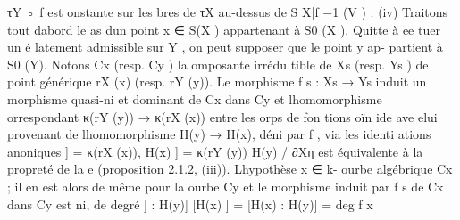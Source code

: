 \documentclass[
  10pt,
]{article}
\newenvironment{Shaded}{}{}
\newcommand{\NormalTok}[1]{#1}
\begin{document}
\begin{Shaded}
\begin{Highlighting}[]
\NormalTok{       τY ◦ f est onstante sur les bres de τX au{-}dessus de S X|f −1 (V ) .}
\NormalTok{(iv) Traitons tout d\textquotesingle{}abord le as d\textquotesingle{}un point x ∈ S(X ) appartenant à S0 (X ).}
\NormalTok{   Quitte à ee tuer un é latement admissible sur Y , on peut supposer que le point y ap{-}}
\NormalTok{partient à S0 (Y). Notons Cx (resp. Cy ) la omposante irrédu tible de Xs (resp. Ys ) de point}
\NormalTok{générique rX (x) (resp. rY (y)).}
\NormalTok{   Le morphisme f s : Xs → Ys induit un morphisme quasi{-}ni et dominant de Cx dans Cy et}
\NormalTok{l\textquotesingle{}homomorphisme orrespondant κ(rY (y)) → κ(rX (x)) entre les orps de fon tions oïn ide}
\NormalTok{ave elui provenant de l\textquotesingle{}homomorphisme H(y) → H(x), déni par f , via les identi ations}
\NormalTok{  anoniques}
\NormalTok{                             ] = κ(rX (x)),}
\NormalTok{                            H(x)                 ] = κ(rY (y))}
\NormalTok{                                                H(y)}
\NormalTok{                                          / ∂Xη est équivalente à la propreté de la e}
\NormalTok{(proposition 2.1.2, (iii)). L\textquotesingle{}hypothèse x ∈                                         k{-} ourbe}
\NormalTok{algébrique Cx ; il en est alors de même pour la ourbe Cy et le morphisme induit par f s de}
\NormalTok{Cx dans Cy est ni, de degré}
\NormalTok{                              ] : H(y)]}
\NormalTok{                             [H(x) ] = [H(x) : H(y)] = deg f}
\NormalTok{                                                          x}


\end{Highlighting}
\end{Shaded}
\end{document}
